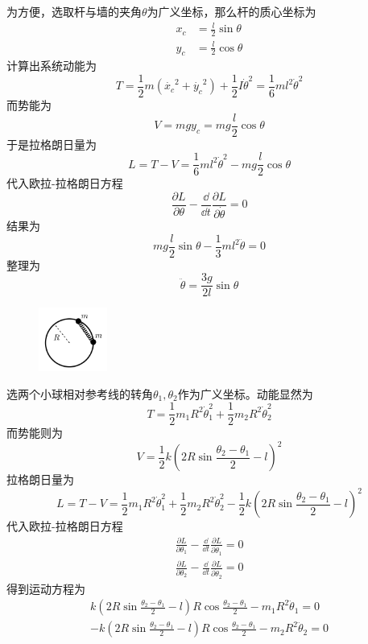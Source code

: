 \begin{solution}
    为方便，选取杆与墙的夹角\(\theta\)为广义坐标，那么杆的质心坐标为
    \begin{align*}
    	x_c&=\frac{l}{2}\sin{\theta}\\
    	y_c&=\frac{l}{2}\cos{\theta}
    \end{align*}
    计算出系统动能为
    \[T=\frac{1}{2}m(\dot{x_c}^2+\dot{y_c}^2)+\frac{1}{2}I\dot{\theta}^2=\frac{1}{6}ml^2\dot{\theta}^2\]
    而势能为
    \[V=mgy_c=mg\frac{l}{2}\cos{\theta}\]
    于是拉格朗日量为
    \[L=T-V=\frac{1}{6}ml^2\dot{\theta}^2-mg\frac{l}{2}\cos{\theta}\]
    代入欧拉-拉格朗日方程
    \[\frac{\partial L}{\partial \theta}-\frac{\dd}{\dd t}\frac{\partial L}{\partial \dot{\theta}}=0\]
    结果为
    \[mg\frac{l}{2}\sin{\theta}-\frac{1}{3}ml^2\ddot{\theta}=0\]
    整理为
    \[\ddot{\theta}=\frac{3g}{2l}\sin{\theta}\]
\end{solution}


\begin{figure}[h]
	\centering
	\includegraphics[width=0.2\textwidth]{content/Figures/4-5}
	\caption{ }
	\label{fig:4-5}
\end{figure}

\begin{solution}
    选两个小球相对参考线的转角\(\theta_1,\theta_2\)作为广义坐标。动能显然为
    \[T=\frac{1}{2}m_1 R^2 \dot{\theta}_1^2+\frac{1}{2}m_2 R^2 \dot{\theta}_2^2\]
    而势能则为
    \[V=\frac{1}{2}k (2R\sin{\frac{\theta_2-\theta_1}{2}}-l)^2\]
    拉格朗日量为
    \[L=T-V=\frac{1}{2}m_1 R^2 \dot{\theta}_1^2+\frac{1}{2}m_2 R^2 \dot{\theta}_2^2-\frac{1}{2}k (2R\sin{\frac{\theta_2-\theta_1}{2}}-l)^2\]
    代入欧拉-拉格朗日方程
    \begin{align*}
    	\frac{\partial L}{\partial \theta_1}-\frac{\dd}{\dd t}\frac{\partial L}{\partial \dot{\theta}_1}=0\\
    	\frac{\partial L}{\partial \theta_2}-\frac{\dd}{\dd t}\frac{\partial L}{\partial \dot{\theta}_2}=0
    \end{align*}
    得到运动方程为
    \begin{align*}
    	k(2R\sin{\frac{\theta_2-\theta_1}{2}}-l)R\cos{\frac{\theta_2-\theta_1}{2}}-m_1 R^2 \ddot{\theta}_1=0\\
    	-k(2R\sin{\frac{\theta_2-\theta_1}{2}}-l)R\cos{\frac{\theta_2-\theta_1}{2}}-m_2 R^2 \ddot{\theta}_2=0
    \end{align*}
\end{solution}


